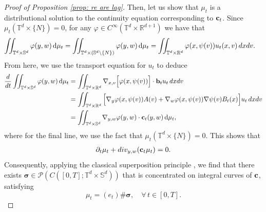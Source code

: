 \documentclass[11pt,reqno,a4paper]{amsart}
\newcommand{\R}{\mathbb{R}}
\newcommand{\p}{\partial}
\theoremstyle{definition}
\theoremstyle{remark}
\numberwithin{equation}{section}
\newcommand{\T} {\mathbb T}
\newcommand{\bq}{\begin{equation}}
\newcommand{\eq}{\end{equation}}
\newcommand{\bfb}{{\bf b}}
\newcommand{\bfc}{{\bf c}}
\newcommand{\bbS}{\mathbb S}
\newcommand{\calP}{\mathcal P}
\newcommand{\dx}{\textnormal{d}x}
\newcommand{\dv}{\textnormal{d}v}
\newcommand{\dt}{\textnormal{d}t}
\newcommand{\dd}{\mathrm{d}}
\newcommand{\ddt}{\frac{\textnormal{d}}{\dt}}
\begin{document}
\begin{proof}[Proof of Proposition \ref{prop: re are lag}]
    Then, let us show that $\mu_t$ is a distributional solution to the continuity equation corresponding to $\bfc_t$. Since $\mu_t(\T^d\times\{N\}) = 0$, for any $\varphi\in C^\infty(\T^d\times\R^{d+1})$ we have that
    \begin{align*}
        \iint_{\T^d\times\bbS^d} \varphi(y,w)\,\dd\mu_t &= \iint_{\T^d\times (\bbS^d\setminus\{N\})} \varphi(y,w) \, \dd\mu_t = \iint_{\T^d\times \R^d} \varphi(x,\psi(v)) u_t(x,v) \,\dx\dv.
     \end{align*}
     From here, we use the transport equation for $u_t$ to deduce
     \begin{align*}
         \ddt \iint_{\T^d\times \bbS^d} \varphi(y,w)\,\dd\mu_t &= \iint_{\T^d\times\R^d} \nabla_{x,v} \Big[\varphi(x,\psi(v))\Big] \cdot \bfb_t u_t \, \dx\dv \\
         &= \iint_{\T^d\times\R^d} \Big[\nabla_y \varphi(x,\psi(v)) A(v) + \nabla_w \varphi(x,\psi(v)) \nabla \psi(v) B_t(x) \Big] u_t\,\dx\dv \\
         &= \iint_{\T^d\times \bbS^d} \nabla_{y,w}\varphi(y,w) \cdot \bfc_t(y,w) \,\dd\mu_t,
     \end{align*}
     where for the final line, we use the fact that $\mu_t(\T^d\times \{N\}) = 0$. This shows that
     \begin{align*}
         \p_t \mu_t + \textnormal{div}_{y,w}(\bfc_t \mu_t) = 0.
     \end{align*}
     Consequently, applying the classical superposition principle \cite[Theorem 2.1]{ambrosiocolombofigalli2015}, we find that there exists $\boldsymbol{\sigma}\in \calP(C([0,T];\T^d\times \bbS^d))$ that is concentrated on integral curves of $\bfc$, satisfying
     \bq \label{eq: sigma}
     \mu_t = (e_t){\#\boldsymbol{\sigma}}, \quad \forall\, t\in [0,T].
     \eq


\end{proof}
\end{document}
